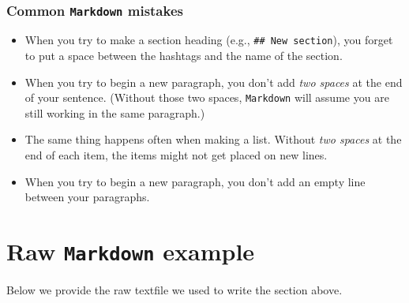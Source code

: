 \documentclass[
]{book}
\begin{document}
~

\hypertarget{common-markdown-mistakes}{%
\subsubsection*{\texorpdfstring{Common \texttt{Markdown} mistakes}{Common Markdown mistakes}}\label{common-markdown-mistakes}}

\begin{itemize}
\item
  When you try to make a section heading (e.g., \texttt{\#\#\ New\ section}),
  you forget to put a space between the hashtags and the name of the section.
\item
  When you try to begin a new paragraph, you don't add \emph{two spaces}
  at the end of your sentence. (Without those two spaces, \texttt{Markdown}
  will assume you are still working in the same paragraph.)
\item
  The same thing happens often when making a list. Without \emph{two spaces}
  at the end of each item, the items might not get placed on new lines.
\item
  When you try to begin a new paragraph, you don't add an empty line
  between your paragraphs.
\end{itemize}

\hypertarget{raw-markdown-example}{%
\section*{\texorpdfstring{Raw \texttt{Markdown} example}{Raw Markdown example}}\label{raw-markdown-example}}

Below we provide the raw textfile we used to write the section above.
\end{document}
